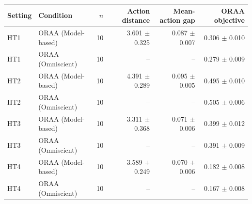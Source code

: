 \begin{tabular}{llrrrr}
\toprule
Setting & Condition & $n$ & Action distance & Mean-action gap & ORAA objective \\
\midrule
HT1 & ORAA (Model-based) & 10 & 3.601 $\pm$ 0.325 & 0.087 $\pm$ 0.007 & 0.306 $\pm$ 0.010 \\
HT1 & ORAA (Omniscient) & 10 & -- & -- & 0.279 $\pm$ 0.009 \\
HT2 & ORAA (Model-based) & 10 & 4.391 $\pm$ 0.289 & 0.095 $\pm$ 0.005 & 0.495 $\pm$ 0.010 \\
HT2 & ORAA (Omniscient) & 10 & -- & -- & 0.505 $\pm$ 0.006 \\
HT3 & ORAA (Model-based) & 10 & 3.311 $\pm$ 0.368 & 0.071 $\pm$ 0.006 & 0.399 $\pm$ 0.012 \\
HT3 & ORAA (Omniscient) & 10 & -- & -- & 0.391 $\pm$ 0.009 \\
HT4 & ORAA (Model-based) & 10 & 3.589 $\pm$ 0.249 & 0.070 $\pm$ 0.006 & 0.182 $\pm$ 0.008 \\
HT4 & ORAA (Omniscient) & 10 & -- & -- & 0.167 $\pm$ 0.008 \\
\bottomrule
\end{tabular}
